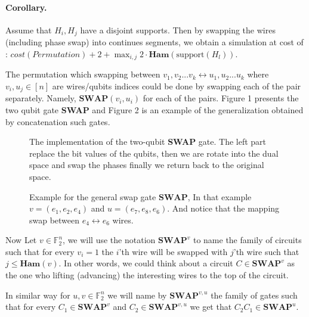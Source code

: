 \documentclass{article}
\begin{document}
\begin{multicols*}{2}
\paragraph{Corollary.} Assume that \(H_{i}, H_{j}\) have a disjoint supports. Then by swapping the wires (including phase swap) into continues segments, we obtain a simulation at cost of : \( cost( Permutation ) + 2 + \max_{ {i,j} } 2 \cdot \textbf{Ham} ( \text{support} ( H_{l} ) )\).  

The permutation which swapping between \({ v_1 , v_2 ... v_k } \leftrightarrow { u_1 , u_2 ... u_k }\) where \(v_i,u_j \in [n]\) are wires/qubits indices could be done by swapping each of the pair separately. Namely, \(\textbf{SWAP}(v_{i},u_{i})\) for each of the pairs. Figure 1 presents the two qubit gate \textbf{SWAP} and Figure 2 is an example of the generalization obtained by concatenation such gates. 


\begin{figure}[H]
  \centering
    
    \caption{The implementation of the two-qubit \textbf{SWAP} gate. The left part replace the bit values of the qubits, then we are rotate into the dual space and swap the phases finally we return back to the original space.}
    \label{fig:average-data-vs-model}
\end{figure}

\begin{figure}[H]
  \centering
    
    \caption{Example for the general swap gate  \( \textbf{SWAP}\), In that example \(v = \left(e_1, e_2, e_4\right) \) and \(u = \left(e_7, e_8, e_6\right)\). And notice that the mapping swap between \( e_4 \leftrightarrow e_6\) wires.  }
    \label{fig:average-data-vs-model}
\end{figure}


Now Let \(v \in \mathbb{F}_{2}^{n}\), we will use the notation \( \textbf{SWAP}^{v} \) to name the family of circuits such that for every \(v_i =1\) the \(i\)'th wire will be swapped with \(j\)'th wire such that \(j \le \textbf{Ham}(v)\). In other words, we could think about a circuit \(C \in \textbf{SWAP}^{v}\) as the one who lifting (advancing) the interesting wires to the top of the circuit.  

In similar way for \(u,v \in \mathbb{F}_{2}^{n}\) we will name by \( \textbf{SWAP}^{v,u} \) the family of gates such that for every \( C_{1} \in \textbf{SWAP}^{v}\) and \( C_{2} \in \textbf{SWAP}^{v,u} \) we get that \(C_{2}C_{1} \in \textbf{SWAP}^{u}\).


\end{multicols*}
\end{document}
